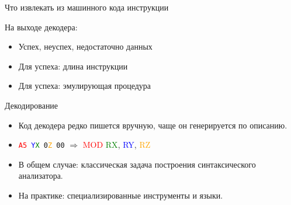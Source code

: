 \documentclass{beamer}
\begin{document}
\begin{frame}{Что извлекать из машинного кода инструкции}
\begin{center}
\end{center}

На выходе декодера: 
\begin{itemize}
\item Успех, неуспех, недостаточно данных
\item Для успеха: длина инструкции
\item Для успеха: эмулирующая процедура
\end{itemize}
\end{frame}







\begin{frame}{Декодирование}
\begin{itemize}
\item Код декодера редко пишется вручную, чаще он генерируется по описанию.
\item \texttt{\textcolor{red}{A5} \textcolor{blue}{Y}\textcolor{green}{X} 0\textcolor{orange}{Z} 00} $\Rightarrow$ \textcolor{red}{MOD} \textcolor{green}{RX}, \textcolor{blue}{RY}, \textcolor{orange}{RZ}
\item В общем случае: классическая задача построения  синтаксического анализатора.
\item На практике: специализированные инструменты и языки.
\end{itemize}
\end{frame}
\end{document}
